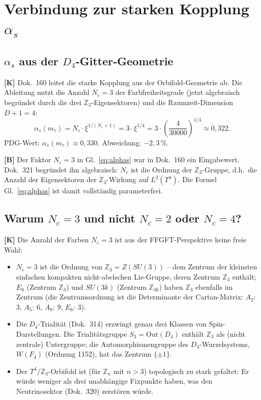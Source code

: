 \section{Verbindung zur starken Kopplung $\alpha_s$}

\subsection{$\alpha_s$ aus der $D_4$-Gitter-Geometrie}

\textbf{[K]} Dok.~160 leitet die starke Kopplung aus der Orbifold-Geometrie
ab. Die Ableitung nutzt die Anzahl $N_c = 3$ der Farbfreiheitsgrade
(jetzt algebraisch begründet durch die drei $\mathbb{Z}_3$-Eigensektoren)
und die Raumzeit-Dimension $D + 1 = 4$:
\begin{equation}
  \alpha_s(m_\tau) = N_c \cdot \xi^{1/(N_c+1)}
  = 3\cdot\xi^{1/4}
  = 3\cdot\left(\frac{4}{30000}\right)^{1/4}
  \approx 0{,}322.
  \label{eq:alphas}
\end{equation}
PDG-Wert: $\alpha_s(m_\tau) \approx 0{,}330$. Abweichung: $-2{,}3\,\%$.

\textbf{[B]} Der Faktor $N_c = 3$ in Gl.~\eqref{eq:alphas} war in
Dok.~160 ein Eingabewert. Dok.~321 begründet ihn algebraisch: $N_c$
ist die Ordnung der $\mathbb{Z}_3$-Gruppe, d.h.\ die Anzahl der
Eigensektoren der $\mathbb{Z}_3$-Wirkung auf $L^2(T^4)$. Die Formel
Gl.~\eqref{eq:alphas} ist damit vollständig parameterfrei.

\subsection{Warum $N_c = 3$ und nicht $N_c = 2$ oder $N_c = 4$?}

\textbf{[K]} Die Anzahl der Farben $N_c = 3$ ist aus der FFGFT-Perspektive
keine freie Wahl:
\begin{itemize}
  \item $N_c = 3$ ist die Ordnung von $\mathbb{Z}_3 = Z(SU(3))$ -- dem
    Zentrum der kleinsten einfachen kompakten nicht-abelschen Lie-Gruppe,
    deren Zentrum $\mathbb{Z}_3$ enthält; $E_6$ (Zentrum $\mathbb{Z}_3$)
    und $SU(3k)$ (Zentrum $\mathbb{Z}_{3k}$) haben $\mathbb{Z}_3$ ebenfalls
    im Zentrum (die Zentrumsordnung ist die Determinante der
    Cartan-Matrix: $A_2$: 3, $A_5$: 6, $A_8$: 9, $E_6$: 3).
  \item Die $D_4$-Trialität (Dok.~314) erzwingt genau drei Klassen
    von Spin-Darstellungen. Die Trialitätsgruppe
    $S_3 = \mathrm{Out}(D_4)$ enthält $\mathbb{Z}_3$ als (nicht zentrale)
    Untergruppe; die Automorphismengruppe des $D_4$-Wurzelsystems,
    $W(F_4)$ (Ordnung 1152), hat das Zentrum $\{\pm1\}$.
  \item Der $T^4/\mathbb{Z}_3$-Orbifold ist (für $\mathbb{Z}_n$ mit
    $n > 3$) topologisch zu stark gefaltet: Er würde weniger als drei
    unabhängige Fixpunkte haben, was den Neutrinosektor (Dok.~320)
    zerstören würde.
\end{itemize}

